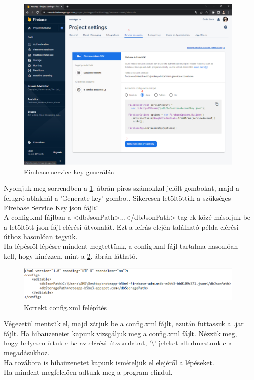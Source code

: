 \begin{figure}[H]
	\centering
	\includegraphics[scale=0.3]{images/config_5.png}
	\caption{Firebase service key generálás}
	\label{fig:firebase_service_key}
\end{figure}
\noindent Nyomjuk meg sorrendben a \ref{fig:firebase_service_key}. ábrán piros számokkal jelölt gombokat, majd a felugró ablaknál a 'Generate key' gombot. Sikeresen letöltöttük a szükséges Firebase Service Key json fájlt!
\vspace{5pt}\\A config.xml fájlban a <dbJsonPath>...</dbJsonPath> tag-ek közé másoljuk be a letöltött json fájl elérési útvonalát. Ezt a leírás elején található példa elérési úthoz hasonlóan tegyük.
\vspace{5pt}\\ Ha lépésről lépésre mindent megtettünk, a config.xml fájl tartalma hasonlóan kell, hogy kinézzen, mint a \ref{fig:config_file_final}. ábrán látható.
\begin{figure}[h]
	\centering
	\includegraphics[scale=0.5]{images/config_6.png}
	\caption{Korrekt config.xml felépítés}
	\label{fig:config_file_final}
\end{figure}
\newline
\noindent Végezetül mentsük el, majd zárjuk be a config.xml fájlt, ezután futtassuk a .jar fájlt. Ha hibaüzenetet kapunk vizsgáljuk meg a config.xml fájlt. Nézzük meg, hogy helyesen írtuk-e be az elérési útvonalakat, '\textbackslash' jeleket alkalmaztunk-e a megadásukhoz. \\Ha továbbra is hibaüzenetet kapunk ismételjük el elejéről a lépéseket.
\vspace{5pt}\\ Ha mindent megfelelően adtunk meg a program elindul.


